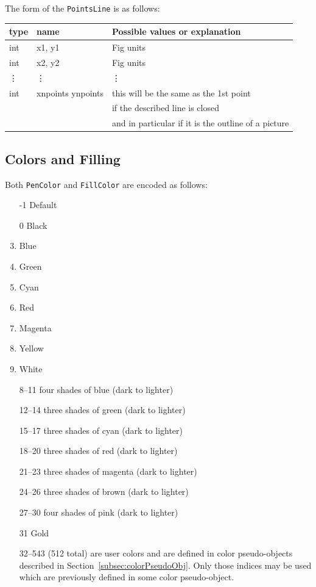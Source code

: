 \documentclass[10pt, a4paper, english]{article}%
\begin{document}
\noindent
The form of the \texttt{PointsLine} is as follows: \\
%
\begin{tabular}{lll}
\toprule
type    & name             & Possible values or explanation \\
\midrule
\midrule
int    & x1, y1            & Fig units \\
int    & x2, y2            & Fig units \\
\vdots & \vdots            &  \vdots    \\
int    & xnpoints ynpoints & this will be the same as the 1st point \\
       &                   & if the described line is closed \\
       &                   & and in particular if it is the outline of a picture \\
\bottomrule
\end{tabular}

\subsection{Colors and Filling}\label{subsec:paramColorsFill}

\noindent
Both \texttt{PenColor} and \texttt{FillColor} are encoded as follows: 
%
\begin{enumerate}
\item[-1]    Default
\item[0]     Black
\item        Blue
\item        Green
\item        Cyan
\item        Red
\item        Magenta
\item        Yellow
\item        White
\item[ 8--11] four shades of blue (dark to lighter)
\item[12--14] three shades of green (dark to lighter)
\item[15--17] three shades of cyan (dark to lighter)
\item[18--20] three shades of red (dark to lighter)
\item[21--23] three shades of magenta (dark to lighter)
\item[24--26] three shades of brown (dark to lighter)
\item[27--30] four shades of pink (dark to lighter)
\item[31]    Gold
\item[32--543] (512 total) are user colors and
              are defined in color pseudo-objects 
              described in Section~\ref{subsec:colorPseudoObj}. 
              Only those indices may be used 
              which are previously defined in some color pseudo-object. 
\end{enumerate}
\end{document}
